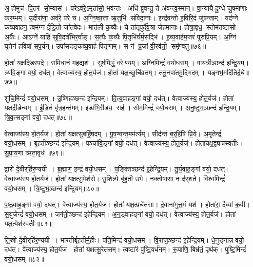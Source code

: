 अ॒हो॒मुच॑ पि॒तर॑ सो॒म्यास॑।
परेऽव॑रे॒ऽमृता॑सो॒ भव॑न्तः।
अधि॑ ब्रुवन्तु॒ ते अ॑वन्त्व॒स्मान्।
वा॒न्या॑यै दु॒ग्धे जु॒षमा॑णाः कर॒म्भम्।
उ॒दीरा॑णा॒ अव॑रे॒ परे॑ च।
अ॒ग्नि॒ष्वा॒त्ता ऋ॒तुभि॑ संविदा॒नाः।
इन्द्र॑वन्तो ह॒विरि॒दं जु॑षन्ताम्।
यद॑ग्ने कव्यवाहन॒ त्वम॑ग्न ईडि॒तो जा॑तवेदः।
मात॑ली क॒व्यैः।
ये ता॑तृ॒पुर्दे॑व॒त्रा जेह॑मानाः।
हो॒त्रा॒वृध॒ स्तोम॑तष्टासो अ॒र्कैः।
आऽग्ने॑ याहि सुवि॒दत्रे॑भिर॒र्वाङ्।
स॒त्यैः क॒व्यैः पि॒तृभि॑र्घर्म॒सद्भि॑।
ह॒व्य॒वाह॑म॒जरं॑ पुरुप्रि॒यम्।
अ॒ग्निं घृ॒तेन॑ ह॒विषा॑ सप॒र्यन्।
उपा॑सदङ्कव्य॒वाहं॑ पितृ॒णाम्।
स न॑ प्र॒जां वी॒रव॑ती॒ समृ॑ण्वतु॥७६॥\anuvakamend[अन॑ग्निष्वात्ता॒ जेह॑मानाः स॒प्त च॑]

होता॑ यक्षदि॒डस्प॒दे।
स॒मि॒धा॒नं म॒हद्यश॑।
सुष॑मिद्धं॒ वरेण्यम्।
अ॒ग्निमिन्द्रं॑ वयो॒धसम्।
गा॒य॒त्रीञ्छन्द॑ इन्द्रि॒यम्।
त्र्यवि॒ङ्गां वयो॒ दध॑त्।
वेत्वाज्य॑स्य॒ होत॒र्यज॑।
होता॑ यक्ष॒च्छुचि॑व्रतम्।
तनू॒नपा॑तमु॒द्भिदम्।
यङ्गर्भ॒मदि॑तिर्द॒धे॥७७॥

शुचि॒मिन्द्रं॑ वयो॒धसम्।
उ॒ष्णिह॒ञ्छन्द॑ इन्द्रि॒यम्।
दि॒त्य॒वाह॒ङ्गां वयो॒ दध॑त्।
वेत्वाज्य॑स्य॒ होत॒र्यज॑।
होता॑ यक्षदी॒डेन्यम्।
ई॒डि॒तं वृ॑त्र॒हन्त॑मम्।
इडा॑भि॒रीड्य॒ सह॑।
सोम॒मिन्द्रं॑ वयो॒धसम्।
अ॒नु॒ष्टुभ॒ञ्छन्द॑ इन्द्रि॒यम्।
त्रि॒व॒त्सङ्गां वयो॒ दध॑त्॥७८॥

वेत्वाज्य॑स्य॒ होत॒र्यज॑।
होता॑ यक्षत्सुबर्\mbox{}हि॒षदम्।
पू॒ष॒ण्वन्त॒मम॑र्त्यम्।
सीद॑न्तं ब॒र्॒हिषि॑ प्रि॒ये।
अ॒मृतेन्द्रं॑ वयो॒धसम्।
बृ॒ह॒तीञ्छन्द॑ इन्द्रि॒यम्।
पञ्चा॑वि॒ङ्गां वयो॒ दध॑त्।
वेत्वाज्य॑स्य॒ होत॒र्यज॑।
होता॑यक्ष॒द्व्यच॑स्वतीः।
सु॒प्रा॒य॒णा ऋ॑ता॒वृध॑॥७९॥

द्वारो॑ दे॒वीर्‌हि॑र॒ण्ययी।
ब्र॒ह्माण॒ इन्द्रं॑ वयो॒धसम्।
प॒ङ्क्तिञ्छन्द॑ इ॒हेन्द्रि॒यम्।
तु॒र्य॒वाह॒ङ्गां वयो॒ दध॑त्।
वेत्वाज्य॑स्य॒ होत॒र्यज॑।
होता॑ यक्षत्सु॒पेश॑से।
सु॒शि॒ल्पे बृ॑ह॒ती उ॒भे।
नक्तो॒षासा॒ न द॑र्‌श॒ते।
विश्व॒मिन्द्रं॑ वयो॒धसम्।
त्रि॒ष्टुभ॒ञ्छन्द॑ इन्द्रि॒यम्॥८०॥

प॒ष्ठ॒वाह॒ङ्गां वयो॒ दध॑त्।
वेत्वाज्य॑स्य॒ होत॒र्यज॑।
होता॑ यक्ष॒त्प्रचे॑तसा।
दे॒वाना॑मुत्त॒मं यश॑।
होता॑रा॒ दैव्या॑ क॒वी।
स॒युजेन्द्रं॑ वयो॒धसम्।
जग॑ती॒ञ्छन्द॑ इ॒हेन्द्रि॒यम्।
अ॒न॒ड्वाह॒ङ्गां वयो॒ दध॑त्।
वेत्वाज्य॑स्य॒ होत॒र्यज॑।
होता॑ यक्ष॒त्पेश॑स्वतीः॥८१॥

ति॒स्रो दे॒वीर्‌हि॑र॒ण्ययी।
भार॑तीर्बृह॒तीर्म॒हीः।
पति॒मिन्द्रं॑ वयो॒धसम्।
वि॒राज॒ञ्छन्द॑ इ॒हेन्द्रि॒यम्।
धे॒नुङ्गान्न वयो॒ दध॑त्।
वेत्वाज्य॑स्य॒ होत॒र्यज॑।
होता॑ यक्षत्सु॒रेत॑सम्।
त्वष्टा॑रं पुष्टि॒वर्ध॑नम्।
रू॒पाणि॒ बिभ्र॑तं॒ पृथ॑क्।
पुष्टि॒मिन्द्रं॑ वयो॒धसम्॥८२॥

